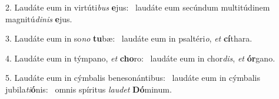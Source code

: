 2. Laudáte eum in virtúti\textit{bus} \textbf{e}jus: \ast\  laudáte eum secúndum multitúdinem magnitú\textit{di}\textit{nis} \textbf{e}jus.\

3. Laudáte eum in so\textit{no} \textbf{tu}bæ: \ast\  laudáte eum in psaltéri\textit{o}, \textit{et} \textbf{cí}thara.\

4. Laudáte eum in týmpano, \textit{et} \textbf{cho}ro: \ast\  laudáte eum in chor\textit{dis}, \textit{et} \textbf{ór}gano.\

5. Laudáte eum in cýmbalis benesonántibus: \dag\  laudáte eum in cýmbalis jubila\textit{ti}\textbf{ó}nis: \ast\  omnis spíritus \textit{lau}\textit{det} \textbf{Dó}minum.\

